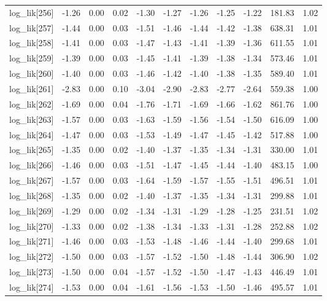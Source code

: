 \begin{table}[ht]
\begin{tabular}{rrrrrrrrrrr}
  log\_lik[256] & -1.26 & 0.00 & 0.02 & -1.30 & -1.27 & -1.26 & -1.25 & -1.22 & 181.83 & 1.02 \\ 
  log\_lik[257] & -1.44 & 0.00 & 0.03 & -1.51 & -1.46 & -1.44 & -1.42 & -1.38 & 638.31 & 1.01 \\ 
  log\_lik[258] & -1.41 & 0.00 & 0.03 & -1.47 & -1.43 & -1.41 & -1.39 & -1.36 & 611.55 & 1.01 \\ 
  log\_lik[259] & -1.39 & 0.00 & 0.03 & -1.45 & -1.41 & -1.39 & -1.38 & -1.34 & 573.46 & 1.01 \\ 
  log\_lik[260] & -1.40 & 0.00 & 0.03 & -1.46 & -1.42 & -1.40 & -1.38 & -1.35 & 589.40 & 1.01 \\ 
  log\_lik[261] & -2.83 & 0.00 & 0.10 & -3.04 & -2.90 & -2.83 & -2.77 & -2.64 & 559.38 & 1.00 \\ 
  log\_lik[262] & -1.69 & 0.00 & 0.04 & -1.76 & -1.71 & -1.69 & -1.66 & -1.62 & 861.76 & 1.00 \\ 
  log\_lik[263] & -1.57 & 0.00 & 0.03 & -1.63 & -1.59 & -1.56 & -1.54 & -1.50 & 616.09 & 1.00 \\ 
  log\_lik[264] & -1.47 & 0.00 & 0.03 & -1.53 & -1.49 & -1.47 & -1.45 & -1.42 & 517.88 & 1.00 \\ 
  log\_lik[265] & -1.35 & 0.00 & 0.02 & -1.40 & -1.37 & -1.35 & -1.34 & -1.31 & 330.00 & 1.01 \\ 
  log\_lik[266] & -1.46 & 0.00 & 0.03 & -1.51 & -1.47 & -1.45 & -1.44 & -1.40 & 483.15 & 1.00 \\ 
  log\_lik[267] & -1.57 & 0.00 & 0.03 & -1.64 & -1.59 & -1.57 & -1.55 & -1.51 & 496.51 & 1.01 \\ 
  log\_lik[268] & -1.35 & 0.00 & 0.02 & -1.40 & -1.37 & -1.35 & -1.34 & -1.31 & 299.88 & 1.01 \\ 
  log\_lik[269] & -1.29 & 0.00 & 0.02 & -1.34 & -1.31 & -1.29 & -1.28 & -1.25 & 231.51 & 1.02 \\ 
  log\_lik[270] & -1.33 & 0.00 & 0.02 & -1.38 & -1.34 & -1.33 & -1.31 & -1.28 & 252.88 & 1.02 \\ 
  log\_lik[271] & -1.46 & 0.00 & 0.03 & -1.53 & -1.48 & -1.46 & -1.44 & -1.40 & 299.68 & 1.01 \\ 
  log\_lik[272] & -1.50 & 0.00 & 0.03 & -1.57 & -1.52 & -1.50 & -1.48 & -1.44 & 306.90 & 1.02 \\ 
  log\_lik[273] & -1.50 & 0.00 & 0.04 & -1.57 & -1.52 & -1.50 & -1.47 & -1.43 & 446.49 & 1.01 \\ 
  log\_lik[274] & -1.53 & 0.00 & 0.04 & -1.61 & -1.56 & -1.53 & -1.50 & -1.46 & 495.57 & 1.01 \\ 

\end{tabular}
\end{table}
